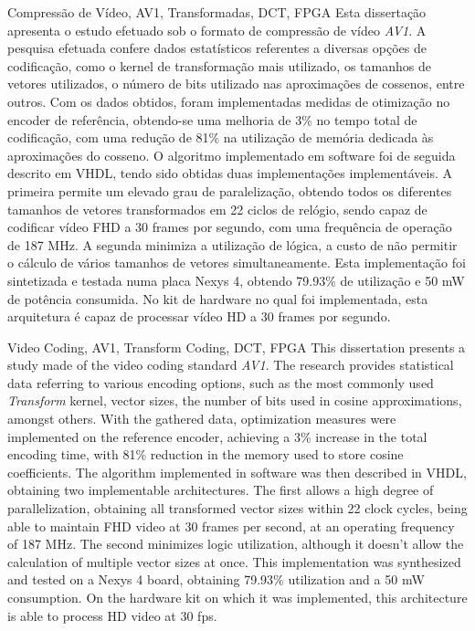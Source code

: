 \TitlePage
  \vspace*{55mm}
       {Compressão de Vídeo, AV1, Transformadas, DCT, FPGA}
       {Esta dissertação apresenta o estudo efetuado sob o formato de compressão de vídeo \emph{AV1}. A pesquisa efetuada confere dados estatísticos referentes a diversas opções de codificação, como o kernel de transformação mais utilizado, os tamanhos de vetores utilizados, o número de bits utilizado nas aproximações de cossenos, entre outros. Com os dados obtidos, foram implementadas medidas de otimização no encoder de referência, obtendo-se uma melhoria de 3\% no tempo total de codificação, com uma redução de 81\% na utilização de memória dedicada às aproximações do cosseno.}
  \TEXT{}
       {O algoritmo implementado em software foi de seguida descrito em VHDL, tendo sido obtidas duas implementações implementáveis. A primeira permite um elevado grau de paralelização, obtendo todos os diferentes tamanhos de vetores transformados em 22 ciclos de relógio, sendo capaz de codificar vídeo FHD a 30 frames por segundo, com uma frequência de operação de 187 MHz. A segunda minimiza a utilização de lógica, a custo de não permitir o cálculo de vários tamanhos de vetores simultaneamente. Esta implementação foi sintetizada e testada numa placa Nexys 4, obtendo 79.93\% de utilização e 50 mW de potência consumida. No kit de hardware no qual foi implementada, esta arquitetura é capaz de processar vídeo HD a 30 frames por segundo.}
\EndTitlePage
\titlepage\ \endtitlepage %

\TitlePage
  \vspace*{55mm}
       {Video Coding, AV1, Transform Coding, DCT, FPGA}
       {This dissertation presents a study made of the video coding standard \emph{AV1}. The research provides statistical data referring to various encoding options, such as the most commonly used \emph{Transform} kernel, vector sizes, the number of bits used in cosine approximations, amongst others. With the gathered data, optimization measures were implemented on the reference encoder, achieving a 3\% increase in the total encoding time, with 81\% reduction in the memory used to store cosine coefficients.}
  \TEXT{}
       {The algorithm implemented in software was then described in VHDL, obtaining two implementable architectures. The first allows a high degree of parallelization, obtaining all transformed vector sizes within 22 clock cycles, being able to maintain FHD video at 30 frames per second, at an operating frequency of 187 MHz. The second minimizes logic utilization, although it doesn't allow the calculation of multiple vector sizes at once. This implementation was synthesized and tested on a Nexys 4 board, obtaining 79.93\% utilization and a 50 mW consumption. On the hardware kit on which it was implemented, this architecture is able to process HD video at 30 fps.}
\EndTitlePage
\titlepage\ \endtitlepage %
